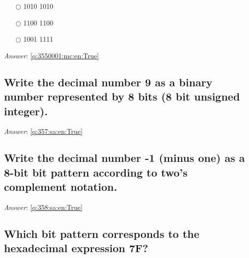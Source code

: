 \documentclass[a4paper,11pt,oneside]{article}
\begin{document}
\begin{sloppypar}
\label{q:3550001:mc:en:False}

\begin{itemize}
  \item[$\bigcirc$] 1010 1010
  \item[$\bigcirc$] 1100 1100
  \item[$\bigcirc$] 1001 1111
\end{itemize}

\vspace{1cm}

\textit{Answer}: \autoref{q:3550001:mc:en:True}





\subsection{Write the decimal number 9 as a binary number represented by 8 bits (8 bit unsigned integer).}

\label{q:357:sa:en:False}

\vspace{2cm}

\noindent\makebox[\textwidth]{\hrulefill}

\vspace{1cm}

\textit{Answer}: \autoref{q:357:sa:en:True}



\subsection{Write the decimal number -1 (minus one) as a 8-bit bit pattern according to two{\textquoteright}s complement notation.}

\label{q:358:sa:en:False}

\vspace{2cm}

\noindent\makebox[\textwidth]{\hrulefill}

\vspace{1cm}

\textit{Answer}: \autoref{q:358:sa:en:True}



\subsection{Which bit pattern corresponds to the hexadecimal expression 7F?}

\label{q:359:sa:en:False}


\end{sloppypar}
\end{document}
